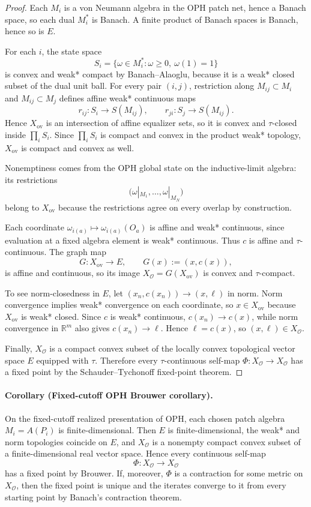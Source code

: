 \begin{proof}
Each \(M_i\) is a von Neumann algebra in the OPH patch net, hence a Banach space, so each dual
\(M_i^*\) is Banach. A finite product of Banach spaces is Banach, hence so is \(E\).

For each \(i\), the state space
\[
S_i=\{\omega\in M_i^*:\omega\ge 0,\ \omega(1)=1\}
\]
is convex and weak* compact by Banach--Alaoglu, because it is a weak* closed subset of the dual
unit ball. For every pair \((i,j)\), restriction along \(M_{ij}\subset M_i\) and
\(M_{ij}\subset M_j\) defines affine weak* continuous maps
\[
r_{ij}:S_i\to S(M_{ij}),
\qquad
r_{ji}:S_j\to S(M_{ij}).
\]
Hence \(X_{\mathrm{ov}}\) is an intersection of affine equalizer sets, so it is convex and
\(\tau\)-closed inside \(\prod_i S_i\). Since \(\prod_i S_i\) is compact and convex in the
product weak* topology, \(X_{\mathrm{ov}}\) is compact and convex as well.

Nonemptiness comes from the OPH global state on the inductive-limit algebra: its restrictions
\[
\bigl(\omega|_{M_1},\dots,\omega|_{M_N}\bigr)
\]
belong to \(X_{\mathrm{ov}}\) because the restrictions agree on every overlap by construction.

Each coordinate \(\omega_{i(a)}\mapsto \omega_{i(a)}(O_a)\) is affine and weak* continuous, since
evaluation at a fixed algebra element is weak* continuous. Thus \(c\) is affine and
\(\tau\)-continuous. The graph map
\[
G:X_{\mathrm{ov}}\to E,
\qquad
G(x):=(x,c(x)),
\]
is affine and continuous, so its image \(X_{\mathcal O}=G(X_{\mathrm{ov}})\) is convex and
\(\tau\)-compact.

To see norm-closedness in \(E\), let \((x_n,c(x_n))\to (x,\ell)\) in norm. Norm convergence
implies weak* convergence on each coordinate, so \(x\in X_{\mathrm{ov}}\) because
\(X_{\mathrm{ov}}\) is weak* closed. Since \(c\) is weak* continuous, \(c(x_n)\to c(x)\), while
norm convergence in \(\mathbb R^m\) also gives \(c(x_n)\to \ell\). Hence \(\ell=c(x)\), so
\((x,\ell)\in X_{\mathcal O}\).

Finally, \(X_{\mathcal O}\) is a compact convex subset of the locally convex topological vector
space \(E\) equipped with \(\tau\). Therefore every \(\tau\)-continuous self-map
\(\Phi:X_{\mathcal O}\to X_{\mathcal O}\) has a fixed point by the Schauder--Tychonoff
fixed-point theorem.
\end{proof}

\paragraph{Corollary (Fixed-cutoff OPH Brouwer corollary).}
On the fixed-cutoff realized presentation of OPH, each chosen patch algebra \(M_i=A(P_i)\) is
finite-dimensional. Then \(E\) is finite-dimensional, the weak* and norm topologies coincide on
\(E\), and \(X_{\mathcal O}\) is a nonempty compact convex subset of a finite-dimensional real
vector space. Hence every continuous self-map
\[
\Phi:X_{\mathcal O}\to X_{\mathcal O}
\]
has a fixed point by Brouwer. If, moreover, \(\Phi\) is a contraction for some metric on
\(X_{\mathcal O}\), then the fixed point is unique and the iterates converge to it from every
starting point by Banach's contraction theorem.

